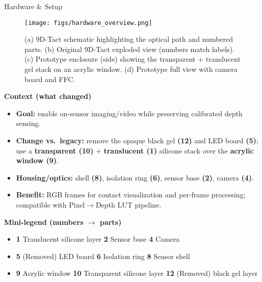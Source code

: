 \documentclass[final]{beamer}
\newlength{\colwidth}
\begin{document}
\begin{frame}[t]
\begin{columns}[t]
\begin{column}{\colwidth}
  \begin{block}{Hardware \& Setup}
  \begin{figure}
  \centering
  \texttt{[image: figs/hardware\_overview.png]}
  \caption{(a) 9D-Tact schematic highlighting the optical path and numbered parts. (b) Original 9D-Tact exploded view (numbers match labels). (c) Prototype enclosure (side) showing the transparent + translucent gel stack on an acrylic window. (d) Prototype full view with camera board and FFC.}
  \end{figure}

  \vspace{-0.5em}
  \textbf{Context (what changed)}
  \begin{itemize}
    \item \textbf{Goal:} enable on-sensor imaging/video while preserving calibrated depth sensing.
    \item \textbf{Change vs.\ legacy:} remove the opaque black gel \textbf{(12)} and LED board \textbf{(5)}; use a \textbf{transparent (10)} + \textbf{translucent (1)} silicone stack over the \textbf{acrylic window (9)}.
    \item \textbf{Housing/optics:} shell \textbf{(8)}, isolation ring \textbf{(6)}, sensor base \textbf{(2)}, camera \textbf{(4)}.
    \item \textbf{Benefit:} RGB frames for contact visualization and per-frame processing; compatible with Pixel$\rightarrow$Depth LUT pipeline.
  \end{itemize}

  \vspace{-0.25em}
  \textbf{Mini-legend (numbers $\rightarrow$ parts)}
  \begin{itemize}
    \item \textbf{1} Translucent silicone layer \hspace{1em} \textbf{2} Sensor base \hspace{1em} \textbf{4} Camera
    \item \textbf{5} (Removed) LED board \hspace{1em} \textbf{6} Isolation ring \hspace{1em} \textbf{8} Sensor shell
    \item \textbf{9} Acrylic window \hspace{1em} \textbf{10} Transparent silicone layer \hspace{1em} \textbf{12} (Removed) black gel layer
  \end{itemize}
  \end{block}


\end{column}
\end{columns}
\end{frame}
\end{document}
